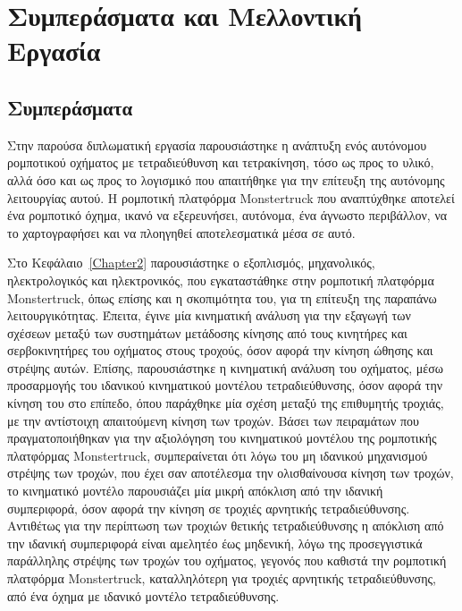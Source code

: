 
\chapter{Συμπεράσματα και Μελλοντική Εργασία} %

\label{Chapter6} %

\section{Συμπεράσματα}
Στην παρούσα διπλωματική εργασία παρουσιάστηκε η ανάπτυξη ενός αυτόνομου ρομποτικού οχήματος με  τετραδιεύθυνση και τετρακίνηση, τόσο ως προς το υλικό, αλλά όσο και ως προς το λογισμικό που απαιτήθηκε για την επίτευξη της αυτόνομης λειτουργίας αυτού. Η ρομποτική πλατφόρμα Monstertruck που αναπτύχθηκε αποτελεί ένα ρομποτικό όχημα, ικανό να εξερευνήσει, αυτόνομα, ένα άγνωστο περιβάλλον, να το χαρτογραφήσει και να πλοηγηθεί αποτελεσματικά μέσα σε αυτό.

\bigskip
Στο Kεφάλαιο~\ref{Chapter2} παρουσιάστηκε ο εξοπλισμός, μηχανολικός, ηλεκτρολογικός και ηλεκτρονικός, που εγκαταστάθηκε στην ρομποτική πλατφόρμα Monstertruck, όπως επίσης και η σκοπιμότητα του, για τη επίτευξη της παραπάνω λειτουργικότητας. Έπειτα, έγινε μία κινηματική ανάλυση για την εξαγωγή των σχέσεων μεταξύ των συστημάτων μετάδοσης κίνησης από τους κινητήρες και σερβοκινητήρες του οχήματος στους τροχούς, όσον αφορά την κίνηση ώθησης και στρέψης αυτών. Επίσης, παρουσιάστηκε η κινηματική ανάλυση του οχήματος, μέσω προσαρμογής του ιδανικού κινηματικού μοντέλου τετραδιεύθυνσης, όσον αφορά την κίνηση του στο επίπεδο, όπου παράχθηκε μία σχέση μεταξύ της επιθυμητής τροχιάς, με την αντίστοιχη απαιτούμενη κίνηση των τροχών. Βάσει των πειραμάτων που πραγματοποιήθηκαν για την αξιολόγηση του κινηματικού μοντέλου της ρομποτικής πλατφόρμας Monstertruck, συμπεραίνεται ότι λόγω του μη ιδανικού μηχανισμού στρέψης των τροχών, που έχει σαν αποτέλεσμα την ολισθαίνουσα κίνηση των τροχών, το κινηματικό μοντέλο παρουσιάζει μία μικρή απόκλιση από την ιδανική συμπεριφορά, όσον αφορά την κίνηση σε τροχιές αρνητικής τετραδιεύθυνσης. Aντιθέτως για την περίπτωση των τροχιών θετικής τετραδιεύθυνσης η απόκλιση από την ιδανική συμπεριφορά είναι αμελητέο έως μηδενική, λόγω της προσεγγιστικά παράλληλης στρέψης των τροχών του οχήματος, γεγονός που καθιστά την ρομποτική πλατφόρμα Monstertruck, καταλληλότερη για τροχιές αρνητικής τετραδιεύθυνσης, από ένα όχημα με ιδανικό μοντέλο τετραδιεύθυνσης.

